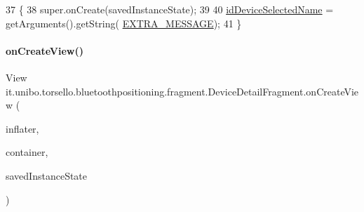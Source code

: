 \begin{DoxyCode}
37                                                     \{
38         super.onCreate(savedInstanceState);
39 
40         \hyperlink{classit_1_1unibo_1_1torsello_1_1bluetoothpositioning_1_1fragment_1_1DeviceDetailFragment_a6d52d8371a07fb8da75879758d1d6942_a6d52d8371a07fb8da75879758d1d6942}{idDeviceSelectedName} = getArguments().getString(
      \hyperlink{classit_1_1unibo_1_1torsello_1_1bluetoothpositioning_1_1fragment_1_1DeviceDetailFragment_a9f7fff4a2b22105976f2c7223d88f9ae_a9f7fff4a2b22105976f2c7223d88f9ae}{EXTRA\_MESSAGE});
41     \}
\end{DoxyCode}
\hypertarget{classit_1_1unibo_1_1torsello_1_1bluetoothpositioning_1_1fragment_1_1DeviceDetailFragment_a6d43be281b577e0d9f2540fea30c2fdf_a6d43be281b577e0d9f2540fea30c2fdf}{}\label{classit_1_1unibo_1_1torsello_1_1bluetoothpositioning_1_1fragment_1_1DeviceDetailFragment_a6d43be281b577e0d9f2540fea30c2fdf_a6d43be281b577e0d9f2540fea30c2fdf} 
\paragraph{\texorpdfstring{on\+Create\+View()}{onCreateView()}}
{\footnotesize\ttfamily View it.\+unibo.\+torsello.\+bluetoothpositioning.\+fragment.\+Device\+Detail\+Fragment.\+on\+Create\+View (\begin{DoxyParamCaption}\item[{Layout\+Inflater}]{inflater,  }\item[{View\+Group}]{container,  }\item[{Bundle}]{saved\+Instance\+State }\end{DoxyParamCaption})}


